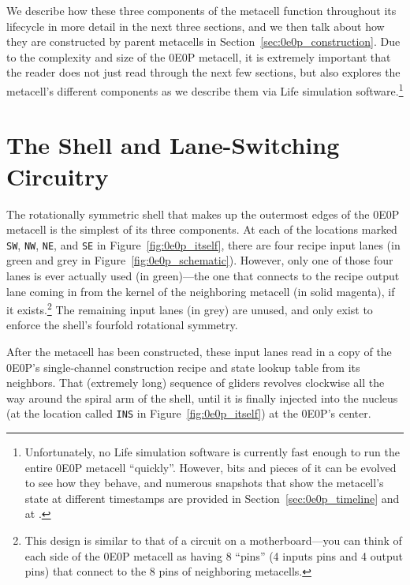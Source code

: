 We describe how these three components of the metacell function throughout its lifecycle in more detail in the next three sections, and we then talk about how they are constructed by parent metacells in Section~\ref{sec:0e0p_construction}. Due to the complexity and size of the 0E0P metacell, it is extremely important that the reader does not just read through the next few sections, but also explores the metacell's different components as we describe them via Life simulation software.\footnote{Unfortunately, no Life simulation software is currently fast enough to run the entire 0E0P metacell ``quickly''. However, bits and pieces of it can be evolved to see how they behave, and numerous snapshots that show the metacell's state at different timestamps are provided in Section~\ref{sec:0e0p_timeline} and at .}


\section{The Shell and Lane-Switching Circuitry}\label{sec:0e0p_structure_shell}

The rotationally symmetric shell that makes up the outermost edges of the 0E0P metacell is the simplest of its three components. At each of the locations marked \texttt{SW}, \texttt{NW}, \texttt{NE}, and \texttt{SE} in Figure~\ref{fig:0e0p_itself}, there are four recipe input lanes (in green and grey in Figure~\ref{fig:0e0p_schematic}). However, only one of those four lanes is ever actually used (in green)---the one that connects to the recipe output lane coming in from the kernel of the neighboring metacell (in solid magenta), if it exists.\footnote{This design is similar to that of a circuit on a motherboard---you can think of each side of the 0E0P metacell as having 8 ``pins'' (4 inputs pins and 4 output pins) that connect to the 8 pins of neighboring metacells.} The remaining input lanes (in grey) are unused, and only exist to enforce the shell's fourfold rotational symmetry.

After the metacell has been constructed, these input lanes read in a copy of the 0E0P's single-channel construction recipe and state lookup table from its neighbors. That (extremely long) sequence of gliders revolves clockwise all the way around the spiral arm of the shell, until it is finally injected into the nucleus (at the location called \texttt{INS} in Figure~\ref{fig:0e0p_itself}) at the 0E0P's center.

